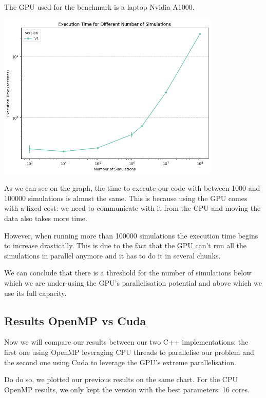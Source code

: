 \documentclass[12pt,a4paper]{report}
\begin{document}
The GPU used for the benchmark is a laptop Nvidia A1000.

\begin{center}
\includegraphics[width=0.8\textwidth]{gpu_benchmark.png}\par
\end{center}

As we can see on the graph, the time to execute our code with between 1000 and 100000 simulations is almost the same. This is because using the GPU comes with a fixed cost: we need to communicate with it from the CPU and moving the data also takes more time.

However, when running more than 100000 simulations the execution time begins to increase drastically. This is due to the fact that the GPU can't run all the simulations in parallel anymore and it has to do it in several chunks.

We can conclude that there is a threshold for the number of simulations below which we are under-using the GPU's parallelisation potential and above which we use its full capacity.

\subsection{Results OpenMP vs Cuda}

Now we will compare our results between our two C++ implementations: the first one using OpenMP leveraging CPU threads to parallelise our problem and the second one using Cuda to leverage the GPU's extreme parallelisation.

Do do so, we plotted our previous results on the same chart. For the CPU OpenMP results, we only kept the version with the best parameters: 16 cores.
\end{document}
